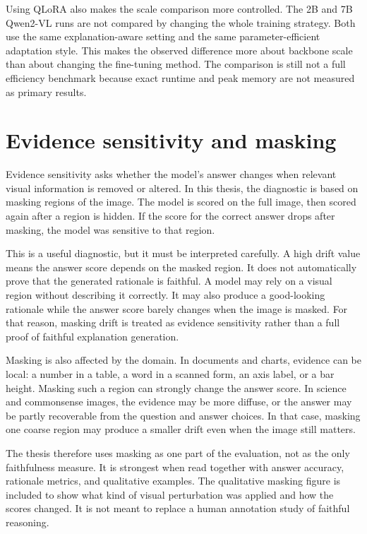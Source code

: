 \documentclass[12pt,bibliography=totoc,listof=totoc,BCOR=5mm,DIV=12,oneside,open=any]{scrbook}
\begin{document}
Using QLoRA also makes the scale comparison more controlled.
The 2B and 7B Qwen2-VL runs are not compared by changing the whole training strategy.
Both use the same explanation-aware setting and the same parameter-efficient adaptation style.
This makes the observed difference more about backbone scale than about changing the fine-tuning method.
The comparison is still not a full efficiency benchmark because exact runtime and peak memory are not measured as primary results.

\section{Evidence sensitivity and masking}
Evidence sensitivity asks whether the model's answer changes when relevant visual information is removed or altered.
In this thesis, the diagnostic is based on masking regions of the image.
The model is scored on the full image, then scored again after a region is hidden.
If the score for the correct answer drops after masking, the model was sensitive to that region.

This is a useful diagnostic, but it must be interpreted carefully.
A high drift value means the answer score depends on the masked region.
It does not automatically prove that the generated rationale is faithful.
A model may rely on a visual region without describing it correctly.
It may also produce a good-looking rationale while the answer score barely changes when the image is masked.
For that reason, masking drift is treated as evidence sensitivity rather than a full proof of faithful explanation generation.

Masking is also affected by the domain.
In documents and charts, evidence can be local: a number in a table, a word in a scanned form, an axis label, or a bar height.
Masking such a region can strongly change the answer score.
In science and commonsense images, the evidence may be more diffuse, or the answer may be partly recoverable from the question and answer choices.
In that case, masking one coarse region may produce a smaller drift even when the image still matters.

The thesis therefore uses masking as one part of the evaluation, not as the only faithfulness measure.
It is strongest when read together with answer accuracy, rationale metrics, and qualitative examples.
The qualitative masking figure is included to show what kind of visual perturbation was applied and how the scores changed.
It is not meant to replace a human annotation study of faithful reasoning.
\end{document}

